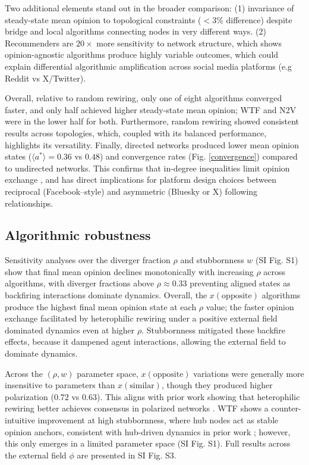 \documentclass[unnumsec,webpdf,contemporary,large]{oup-authoring-template}%
\theoremstyle{thmstyleone}%
\theoremstyle{thmstyletwo}%
\theoremstyle{thmstylethree}%
\begin{document}
Two additional elements stand out in the broader comparison: (1) invariance of steady-state mean opinion to topological constraints ($<3$\% difference) despite bridge and local algorithms connecting nodes in very different ways. (2) Recommenders are $20 \times$ more sensitivity to network structure, which shows opinion-agnostic algorithms produce highly variable outcomes, which could explain differential algorithmic amplification across social media platforms (e.g Reddit vs X/Twitter).

Overall, relative to random rewiring, only one of eight algorithms converged faster, and only half achieved higher steady-state mean opinion; WTF and N2V were in the lower half for both. Furthermore, random rewiring showed consistent results across topologies, which, coupled with its balanced performance, highlights its versatility. Finally, directed networks produced lower mean opinion states ($\langle  a ^* \rangle=0.36$ vs $0.48$) and convergence rates (Fig. \ref{convergence}) compared to undirected networks. This confirms that in-degree inequalities limit opinion exchange \cite{karimi_homophily_2018}, and has direct implications for platform design choices between reciprocal (Facebook--style) and asymmetric (Bluesky or X) following relationships.

\subsection{Algorithmic robustness}\label{sec:robustness}

Sensitivity analyses over the diverger fraction $\rho$ and stubbornness $w$ (SI Fig. S1) show that final mean opinion declines monotonically with increasing $\rho$ across algorithms, with diverger fractions above $\rho \approx 0.33$ preventing aligned states as backfiring interactions dominate dynamics. Overall, the $x(\text{opposite})$ algorithms produce the highest final mean opinion state at each $\rho$ value; the faster opinion exchange facilitated by heterophilic rewiring under a positive external field dominated dynamics even at higher $\rho$. Stubbornness mitigated these backfire effects, because it dampened agent interactions, allowing the external field to dominate dynamics.

Across the $(\rho, w)$ parameter space, $x(\text{opposite})$ variations were generally more insensitive to parameters than $x(\text{similar})$, though they produced higher polarization ($0.72$ vs $0.63$). This aligns with prior work showing that heterophilic rewiring better achieves consensus in polarized networks \cite{borges_how_2024}. WTF shows a counter-intuitive improvement at high stubbornness, where hub nodes act as stable opinion anchors, consistent with hub-driven dynamics in prior work \citep{meng_dynamics_2024}; however, this only emerges in a limited parameter space (SI Fig. S1). Full results across the external field $\phi$ are presented in SI Fig. S3.
\end{document}
